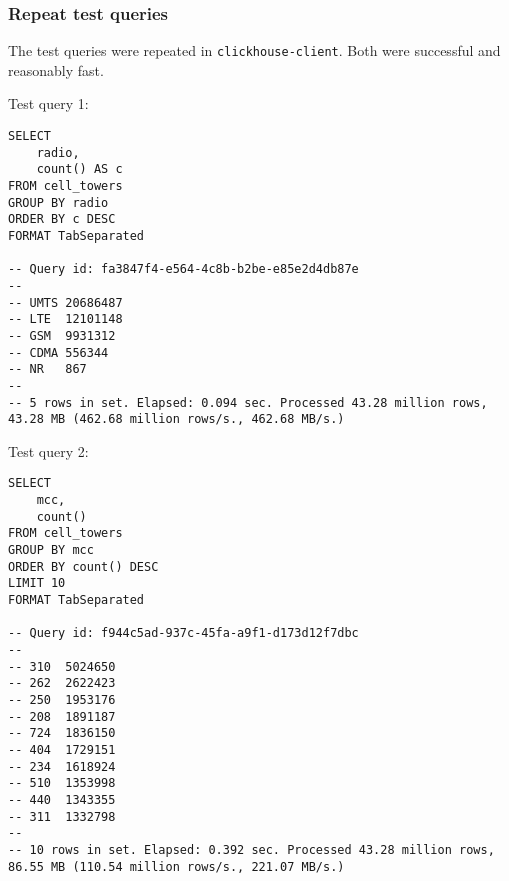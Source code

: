 \subsubsection{Repeat test queries}
\label{sec:org704b2f8}
The test queries were repeated in \texttt{clickhouse-client}.
Both were successful and reasonably fast.

Test query 1:
\begin{verbatim}
SELECT
    radio,
    count() AS c
FROM cell_towers
GROUP BY radio
ORDER BY c DESC
FORMAT TabSeparated

-- Query id: fa3847f4-e564-4c8b-b2be-e85e2d4db87e
--
-- UMTS	20686487
-- LTE	12101148
-- GSM	9931312
-- CDMA	556344
-- NR	867
--
-- 5 rows in set. Elapsed: 0.094 sec. Processed 43.28 million rows, 43.28 MB (462.68 million rows/s., 462.68 MB/s.)
\end{verbatim}

Test query 2:
\begin{verbatim}
SELECT
    mcc,
    count()
FROM cell_towers
GROUP BY mcc
ORDER BY count() DESC
LIMIT 10
FORMAT TabSeparated

-- Query id: f944c5ad-937c-45fa-a9f1-d173d12f7dbc
--
-- 310	5024650
-- 262	2622423
-- 250	1953176
-- 208	1891187
-- 724	1836150
-- 404	1729151
-- 234	1618924
-- 510	1353998
-- 440	1343355
-- 311	1332798
--
-- 10 rows in set. Elapsed: 0.392 sec. Processed 43.28 million rows, 86.55 MB (110.54 million rows/s., 221.07 MB/s.)
\end{verbatim}
